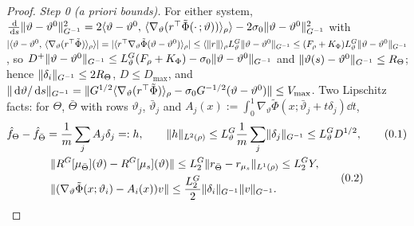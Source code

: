 \begin{proof}
\emph{Step 0 (a priori bounds).} For either system,
$\frac{\,\mathrm{d}}{\,\mathrm{d} s}\lVert \vartheta - \vartheta^0\rVert^2_{G^{-1}}
= 2\langle \vartheta - \vartheta^0,\, \langle\nabla_\vartheta(r^\top\tilde\Phi(\cdot\,;\vartheta))\rangle_\rho\rangle
- 2\sigma_0\lVert \vartheta - \vartheta^0\rVert^2_{G^{-1}}$ with
$\lvert \langle \vartheta - \vartheta^0,\, \langle\nabla_\vartheta(r^\top\tilde\Phi)\rangle_\rho\rangle\rvert
= \lvert \langle r^\top\nabla_\vartheta\tilde\Phi(\vartheta - \vartheta^0)\rangle_\rho\rvert
\le\langle\lVert r\rVert\rangle_\rho L_\vartheta^G\lVert \vartheta - \vartheta^0\rVert_{G^{-1}}
\le(F_\rho + K_\Phi)L_\vartheta^G\lVert \vartheta - \vartheta^0\rVert_{G^{-1}}$, so
$D^+\lVert \vartheta - \vartheta^0\rVert_{G^{-1}}\le L_\vartheta^G(F_\rho + K_\Phi) - \sigma_0\lVert \vartheta - \vartheta^0\rVert_{G^{-1}}$
and $\lVert \vartheta(s) - \vartheta^0\rVert_{G^{-1}}\le R_\Theta$; hence $\lVert \delta_i\rVert_{G^{-1}}\le2R_\Theta$,
$D\le D_{\max}$, and
$\lVert \,\mathrm{d}\vartheta/\,\mathrm{d} s\rVert_{G^{-1}} = \lVert G^{1/2}\langle\nabla_\vartheta(r^\top\tilde\Phi)\rangle_\rho - \sigma_0G^{-1/2}(\vartheta - \vartheta^0)\rVert\le V_{\max}$.
Two Lipschitz facts: for $\Theta$, $\bar\Theta$ with rows $\vartheta_j$, $\bar\vartheta_j$ and
$A_j(x) := \int_0^1\nabla_\vartheta\tilde\Phi(x;\bar\vartheta_j + t\delta_j)\dd t$,
\begin{gather}
  \hat f_\Theta - \hat f_{\bar\Theta} = \frac1m\sum_jA_j\delta_j =: h,\qquad
  \lVert h\rVert_{L^2(\rho)}\le L_\vartheta^G\frac1m\sum_j\lVert \delta_j\rVert_{G^{-1}}\le L_\vartheta^GD^{1/2},
  \tag{0.1}\\
  \begin{split}
  &\lVert R^G[\mu_{\bar\Theta}](\vartheta) - R^G[\mu_s](\vartheta)\rVert\le L_2^G\lVert r_{\bar\Theta} - r_{\mu_s}\rVert_{L^1(\rho)}\le L_2^GY,\\
  &\lVert (\nabla_\vartheta\tilde\Phi(x;\vartheta_i) - A_i(x))v\rVert\le\frac{L_2^G}2\lVert \delta_i\rVert_{G^{-1}}\lVert v\rVert_{G^{-1}}.
  \end{split}
  \tag{0.2}
\end{gather}


\end{proof}
